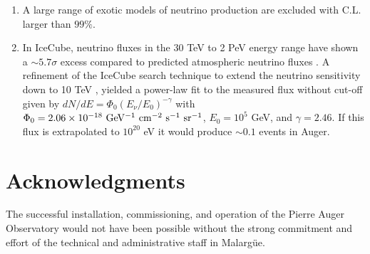 \documentclass[reprint,showpacs,showkeys,amsmath,amssymb,aps,nofootinbib]{revtex4-1}
\begin{document}
\begin{enumerate}
\item 
A large range of exotic models of neutrino production \cite{Sigl} are excluded 
with C.L. larger than $99\%$.

\item
In IceCube, neutrino fluxes in the 30 TeV to 2 PeV energy range 
have shown a ${\sim} 5.7\sigma$ excess compared to predicted atmospheric neutrino fluxes 
\cite{IceCube_PRL14}. 
A refinement of the IceCube search technique to extend the neutrino sensitivity
down to 10 TeV \cite{IceCube_PRD15}, yielded a power-law fit to the measured flux without cut-off given by $dN/dE = \Phi_0 (E_\nu/E_0)^{-\gamma}$
with $\Phi_0=2.06 \times 10^{-18}~{\rm GeV^{-1}~cm^{-2}~s^{-1}~sr^{-1}}$, $E_0=10^5$ GeV, and $\gamma=2.46$. 
If this flux is extrapolated to $10^{20}$ eV it would produce ${\sim} 0.1$ events in Auger.

\end{enumerate}




\section{Acknowledgments}

The successful installation, commissioning, and operation
of the Pierre Auger Observatory would not have been possible
without the strong commitment and effort of the technical
and administrative staff in Malarg\"ue.
\end{document}
